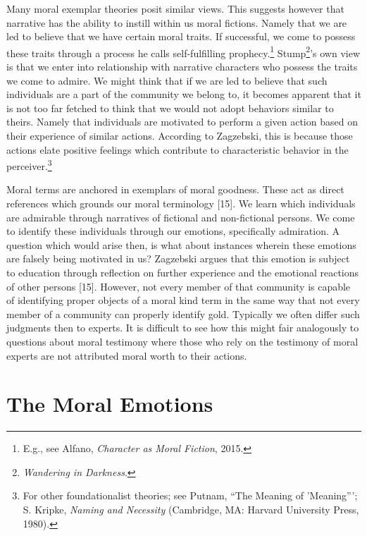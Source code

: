 \documentclass[phdthesis,12pt,final]{wuthesis}
\theoremstyle{definition}
\theoremstyle{definition}
\theoremstyle{definition}
\theoremstyle{definition}
\theoremstyle{remark}
\begin{document}
Many moral exemplar theories posit similar views. This suggests however that narrative has the ability to instill within us moral fictions. Namely that we are led to believe that we have certain moral traits. If successful, we come to possess these traits through a process he calls self-fulfilling prophecy.\footnote{E.g., see Alfano, \emph{Character as Moral Fiction}, 2015.} Stump\footnote{\emph{Wandering in {Darkness}}.}'s own view is that we enter into relationship with narrative characters who possess the traits we come to admire. We might think that if we are led to believe that such individuals are a part of the community we belong to, it becomes apparent that it is not too far fetched to think that we would not adopt behaviors similar to theirs. Namely that individuals are motivated to perform a given action based on their experience of similar actions. According to Zagzebski, this is because those actions elate positive feelings which contribute to characteristic behavior in the perceiver.\footnote{For other foundationalist theories; see Putnam, {``The {Meaning} of '{Meaning}'''}; S. Kripke, \emph{Naming and Necessity} (Cambridge, MA: Harvard University Press, 1980).}

Moral terms are anchored in exemplars of moral goodness. These act as direct references which grounds our moral terminology {[}15{]}. We learn which individuals are admirable through narratives of fictional and non-fictional persons. We come to identify these individuals through our emotions, specifically admiration. A question which would arise then, is what about instances wherein these emotions are falsely being motivated in us? Zagzebski argues that this emotion is subject to education through reflection on further experience and the emotional reactions of other persons {[}15{]}. However, not every member of that community is capable of identifying proper objects of a moral kind term in the same way that not every member of a community can properly identify gold. Typically we often differ such judgments then to experts. It is difficult to see how this might fair analogously to questions about moral testimony where those who rely on the testimony of moral experts are not attributed moral worth to their actions.

\section{The Moral Emotions}\label{the-moral-emotions}
\end{document}
